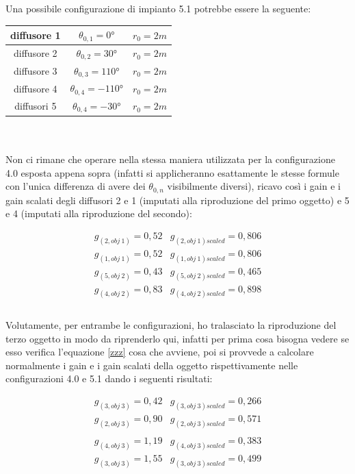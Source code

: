 \documentclass[12pt,a4paper]{report}
\begin{document}
Una possibile configurazione di impianto 5.1 potrebbe essere la seguente:

\begin{tabular}{|c|c|c|}
\hline
diffusore 1 & $\theta_{0,1}=0°$ & $r_0=2m$\\
\hline
diffusore 2 & $\theta_{0,2}=30°$ & $r_0=2m$\\
\hline
diffusore 3 & $\theta_{0,3}=110°$ & $r_0=2m$\\
\hline
diffusore 4 & $\theta_{0,4}=-110°$ & $r_0=2m$\\
\hline
diffusori 5 & $\theta_{0,4}=-30°$ & $r_0=2m$\\
\hline
\end{tabular} \\
\\

Non ci rimane che operare nella stessa maniera utilizzata per la configurazione 4.0 esposta appena sopra (infatti si applicheranno esattamente le stesse formule con l'unica differenza di avere dei $\theta_{0,n}$ visibilmente diversi), ricavo così i gain e i gain scalati degli diffusori 2 e 1 (imputati alla riproduzione del primo oggetto) e 5 e 4 (imputati alla riproduzione del secondo):

\begin{equation}
\begin{matrix}
g_{(2,obj\ 1)} = 0,52 & g_{(2,obj\ 1)scaled} = 0,806\\
g_{(1,obj\ 1)} = 0,52 & g_{(1,obj\ 1)scaled} = 0,806\\
g_{(5,obj\ 2)} = 0,43 & g_{(5,obj\ 2)scaled} = 0,465\\
g_{(4,obj\ 2)} = 0,83 & g_{(4,obj\ 2)scaled} = 0,898  \\

\end{matrix}
\label{gscalatiesempio2}
\end{equation} \\


Volutamente, per entrambe le configurazioni, ho tralasciato la riproduzione del terzo oggetto in modo da riprenderlo qui, infatti per prima cosa bisogna vedere se esso verifica l'equazione \ref{zzz} cosa che avviene, poi si provvede a calcolare normalmente i gain e i gain scalati della oggetto rispettivamente nelle configurazioni 4.0 e 5.1 dando i seguenti risultati:

\begin{equation}
\begin{matrix}
g_{(3,obj\ 3)} = 0,42 & g_{(3,obj\ 3)scaled} = 0,266\\
g_{(2,obj\ 3)} = 0,90 & g_{(2,obj\ 3)scaled} = 0,571\\
\\
g_{(4,obj\ 3)} = 1,19 & g_{(4,obj\ 3)scaled} = 0,383\\
g_{(3,obj\ 3)} = 1,55 & g_{(3,obj\ 3)scaled} = 0,499\\

\end{matrix}
\label{gscalatiesempiooggetto3}
\end{equation} \\
\end{document}
